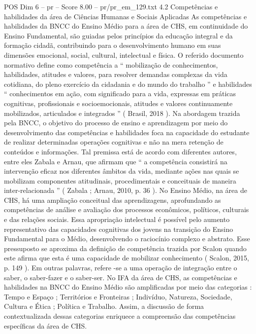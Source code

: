 \begin{textsample}{POS Dim 6 – pr – Score 8.00 – pr/pr\_em\_129.txt}  \label{ex:f6_pos_029}
4.2 Competências e habilidades da área de Ciências Humanas e Sociais Aplicadas As competências e habilidades da BNCC do Ensino Médio para a área de CHS, em continuidade do Ensino Fundamental, são guiadas pelos princípios da educação integral e da formação cidadã, contribuindo para o desenvolvimento humano em suas dimensões emocional, social, cultural, intelectual e física.
O referido documento normativo define como competência a “ mobilização de conhecimentos, habilidades, atitudes e valores, para resolver demandas complexas da vida cotidiana, do pleno exercício da cidadania e do mundo do trabalho ” e habilidades “ conhecimentos em ação, com significado para a vida, expressas em práticas cognitivas, profissionais e socioemocionais, atitudes e valores continuamente mobilizados, articulados e integrados ” ( Brasil, 2018 ).
Na abordagem trazida pela BNCC, o objetivo do processo de ensino e aprendizagem por meio do desenvolvimento das competências e habilidades foca na capacidade do estudante de realizar determinadas operações cognitivas e não na mera retenção de conteúdos e informações.
Tal premissa está de acordo com diferentes autores, entre eles Zabala e Arnau, que afirmam que “ a competência consistirá na intervenção eficaz nos diferentes âmbitos da vida, mediante ações nas quais se mobilizam componentes atitudinais, procedimentais e conceituais de maneira inter-relacionada ” ( Zabala ; Arnau, 2010, p. 36 ).
No Ensino Médio, na área de CHS, há uma ampliação conceitual das aprendizagens, aprofundando as competências de análise e avaliação dos processos econômicos, políticos, culturais e das relações sociais.
Essa apropriação intelectual é possível pelo aumento representativo das capacidades cognitivas dos jovens na transição do Ensino Fundamental para o Médio, desenvolvendo o raciocínio complexo e abstrato.
Esse pressuposto se aproxima da definição de competência trazida por Scalon quando este afirma que esta é uma capacidade de mobilizar conhecimento ( Scalon, 2015, p. 149 ).
Em outras palavras, refere -se a uma operação de integração entre o saber, o saber-fazer e o saber-ser.
No IFA da área de CHS, as competências e habilidades na BNCC do Ensino Médio são amplificadas por meio das categorias : Tempo e Espaço ; Territórios e Fronteiras ; Indivíduo, Natureza, Sociedade, Cultura e Ética ; Política e Trabalho.
Assim, a discussão de forma contextualizada dessas categorias enriquece a compreensão das competências específicas da área de CHS.

\end{textsample}
